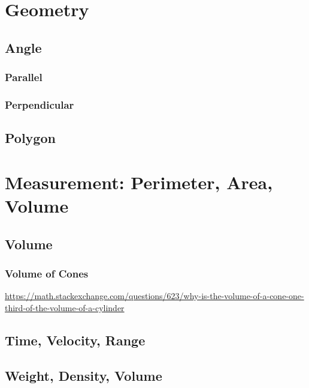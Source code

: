 \chapter{Geometry}
\label{chap:geometry}

\section{Angle}
\label{sec:angle}

\subsection{Parallel}
\label{sec:parallel}

\subsection{Perpendicular}
\label{sec:perpendicular}


\section{Polygon}
\label{sec:polygon}



\chapter{Measurement: Perimeter, Area, Volume}
\label{chap:perimeter-area-volume}

\section{Volume}
\label{sec:volume}

\subsection{Volume of Cones}
\label{sec:volume-of-cones}
\url{https://math.stackexchange.com/questions/623/why-is-the-volume-of-a-cone-one-third-of-the-volume-of-a-cylinder}

\section{Time, Velocity, Range}
\label{sec:time-velocity-range}

\section{Weight, Density, Volume}
\label{sec:weight-density-volume}


